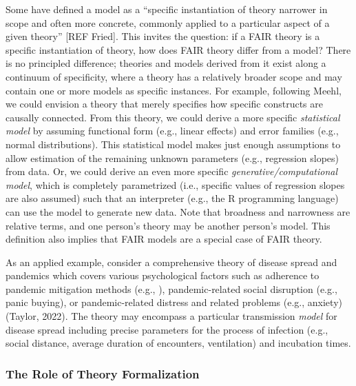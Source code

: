 \documentclass[
  man,floatsintext]{apa6}
\begin{document}
Some have defined a model as a ``specific instantiation of theory narrower in scope and often more concrete, commonly applied to a particular aspect of a given theory'' {[}REF Fried{]}.
This invites the question: if a FAIR theory is a specific instantiation of theory, how does FAIR theory differ from a model?
There is no principled difference;
theories and models derived from it exist along a continuum of specificity, where
a theory has a relatively broader scope and may contain one or more models as specific instances.
For example, following Meehl, we could envision a theory that merely specifies how specific constructs are causally connected.
From this theory, we could derive a more specific \emph{statistical model} by assuming functional form (e.g., linear effects) and error families (e.g., normal distributions).
This statistical model makes just enough assumptions to allow estimation of the remaining unknown parameters (e.g., regression slopes) from data.
Or, we could derive an even more specific \emph{generative/computational model}, which is completely parametrized (i.e., specific values of regression slopes are also assumed) such that an interpreter (e.g., the R programming language) can use the model to generate new data.
Note that broadness and narrowness are relative terms,
and one person's theory may be another person's model.
This definition also implies that FAIR models are a special case of FAIR theory.

As an applied example, consider a comprehensive theory of disease spread and pandemics which covers various psychological factors such as adherence to pandemic mitigation methods (e.g., ), pandemic-related social disruption (e.g., panic buying), or pandemic-related distress and related problems (e.g., anxiety) (Taylor, 2022).
The theory may encompass a particular transmission \emph{model} for disease spread including precise parameters for the process of infection (e.g., social distance, average duration of encounters, ventilation) and incubation times.

\subsubsection{The Role of Theory Formalization}\label{the-role-of-theory-formalization}
\end{document}
